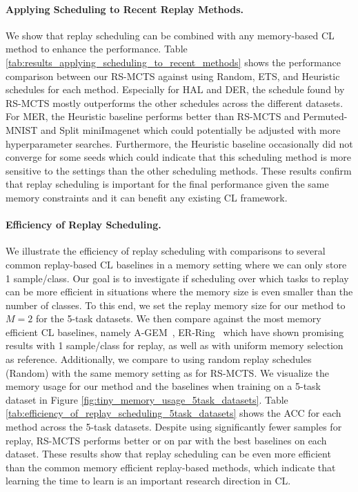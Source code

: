 \paragraph{Applying Scheduling to Recent Replay Methods.} We show that replay scheduling can be combined with any memory-based CL method to enhance the performance. %
Table \ref{tab:results_applying_scheduling_to_recent_methods} shows the performance comparison between our RS-MCTS against using Random, ETS, and Heuristic schedules for each method. Especially for HAL and DER, the schedule found by RS-MCTS mostly outperforms the other schedules across the different datasets. For MER, the Heuristic baseline performs better than RS-MCTS and Permuted-MNIST and Split miniImagenet which could potentially be adjusted with more hyperparameter searches. Furthermore, the Heuristic baseline occasionally did not converge for some seeds which could indicate that this scheduling method is more sensitive to the settings than the other scheduling methods. These results confirm that replay scheduling is important for the final performance given the same memory constraints and it can benefit any existing CL framework. 




\vspace{-3mm}
\paragraph{Efficiency of Replay Scheduling.} We illustrate the efficiency of replay scheduling with comparisons to several common replay-based CL baselines in a memory setting where we can only store 1 sample/class.
Our goal is to investigate if scheduling over which tasks to replay can be more efficient in situations where the memory size is even smaller than the number of classes. 
To this end, we set the replay memory size for our method
to $M=2$ for the 5-task datasets. We then compare against the most memory efficient CL baselines, namely A-GEM~\cite{chaudhry2018efficient}, ER-Ring~\cite{chaudhry2019tiny} which have shown promising results with 1 sample/class for replay, as well as with uniform memory selection as reference. 
Additionally, we compare to using random replay schedules (Random) with the same memory setting as for RS-MCTS.
We visualize the memory usage for our method and the baselines when training on a 5-task dataset in Figure \ref{fig:tiny_memory_usage_5task_datasets}. %
Table \ref{tab:efficiency_of_replay_scheduling_5task_datasets} shows the ACC for each method across the 5-task datasets. Despite using significantly fewer samples for replay, RS-MCTS performs better or on par with the best baselines on each dataset. These results show that replay scheduling can be even more efficient than the common memory efficient replay-based methods, which indicate that learning the time to learn is an important research direction in CL.


